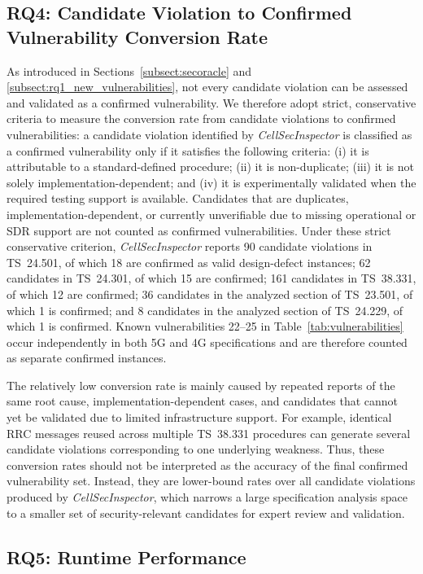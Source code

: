\documentclass[sigconf]{acmart}
\newcommand{\lm}{\textit{CellSecInspector}\xspace}
\begin{document}
{\subsection{RQ4: Candidate Violation to Confirmed Vulnerability Conversion Rate}

As introduced in Sections~\ref{subsect:secoracle} and \ref{subsect:rq1_new_vulnerabilities}, not every candidate violation can be assessed and validated as a confirmed vulnerability. We therefore adopt strict, conservative criteria to measure the conversion rate from candidate violations to confirmed vulnerabilities: a candidate violation identified by \lm is classified as a confirmed vulnerability only if it satisfies the following criteria: (i) it is attributable to a standard-defined procedure; (ii) it is non-duplicate; (iii) it is not solely implementation-dependent; and (iv) it is experimentally validated when the required testing support is available. Candidates that are duplicates, implementation-dependent, or currently unverifiable due to missing operational or SDR support are not counted as confirmed vulnerabilities. 
Under these strict conservative criterion, \lm reports 90 candidate violations in TS~24.501, of which 18 are confirmed as valid design-defect instances; 62 candidates in TS~24.301, of which 15 are confirmed; 161 candidates in TS~38.331, of which 12 are confirmed; 36 candidates in the analyzed section of TS~23.501, of which 1 is confirmed; and 8 candidates in the analyzed section of TS~24.229, of which 1 is confirmed. Known vulnerabilities 22--25 in Table~\ref{tab:vulnerabilities} occur independently in both 5G and 4G specifications and are therefore counted as separate confirmed instances. 


The relatively low conversion rate is mainly caused by repeated reports of the same root cause, implementation-dependent cases, and candidates that cannot yet be validated due to limited infrastructure support. For example, identical RRC messages reused across multiple TS~38.331 procedures can generate several candidate violations corresponding to one underlying weakness. Thus, these conversion rates should not be interpreted as the accuracy of the final confirmed vulnerability set. 
Instead, they are lower-bound rates over all candidate violations produced by \lm, which narrows a large specification analysis space to a smaller set of security-relevant candidates for expert review and validation. 





\subsection{RQ5: Runtime Performance}

}
\end{document}
